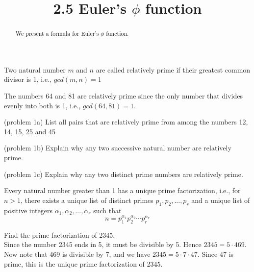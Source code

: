 \documentclass[handout]{ximera}
\title{2.5 Euler's $\phi$ function}
\begin{document}
\begin{abstract}
We present a formula for Euler's $\phi$ function.
\end{abstract}

\maketitle


\begin{definition}
Two natural number $m$ and $n$ are called relatively prime if their greatest common divisor is 1, i.e., $gcd(m,n) = 1$
\end{definition}

\begin{example}[example 1]
The numbers 64 and 81 are relatively prime since the only number that divides evenly into both is 1, i.e., $gcd(64,81) = 1$.
\end{example}

\begin{problem}(problem 1a)
List all pairs that are relatively prime from among the numbers 12, 14, 15, 25 and 45
\end{problem}

\begin{problem}(problem 1b)
Explain why any two successive natural number are relatively prime.
\end{problem}

\begin{problem}(problem 1c)
Explain why any two distinct prime numbers are relatively prime.
\end{problem}

\begin{theorem}
Every natural number greater than 1 has a unique prime factorization, i.e., for $n >1$, there exists a 
unique list of distinct primes
$p_1, p_2, ..., p_r$ and a unique list of positive integers $\alpha_1, \alpha_2, ..., \alpha_r$ such that
\[
n = p_1^{\alpha_1}p_2^{\alpha_2}\cdots p_r^{\alpha_r}
\]
\end{theorem}


\begin{example}[example 2]
Find the prime factorization of 2345.\\
Since the number 2345 ends in 5, it must be divisible by 5.  Hence $2345 = 5 \cdot 469$. Now note that 469 is divisible by 7,
and we have $2345 = 5 \cdot 7 \cdot 47$. Since 47 is prime, this is the unique prime factorization of 2345.
\end{example}
\end{document}

